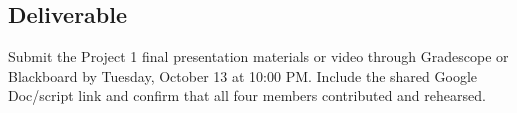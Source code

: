 \documentclass{article}
\newcommand{\submissionplatform}{Gradescope or Blackboard}
\newcommand{\duedate}{Tuesday, October 13 at 10:00 PM}
\begin{document}
\subsection*{Deliverable}
Submit the Project 1 final presentation materials or video through \submissionplatform{} by \duedate{}. Include the shared Google Doc/script link and confirm that all four members contributed and rehearsed.
\end{document}
